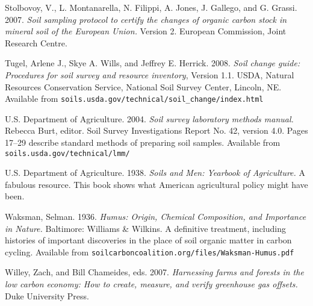 \documentclass[11pt,letterpaper,oneside,onecolumn]{memoir}
\begin{document}
\begin{flushleft}
Stolbovoy, V., L. Montanarella, N. Filippi, A. Jones, J. Gallego, and G. Grassi. 2007. \textit{Soil sampling protocol to certify the changes of organic carbon stock in mineral soil of the European Union.} Version 2. European Commission, Joint Research Centre.

Tugel, Arlene J., Skye A. Wills, and Jeffrey E. Herrick. 2008. \textit{Soil change guide: Procedures for soil survey and resource inventory}, Version 1.1. USDA, Natural Resources Conservation Service, National Soil Survey Center, Lincoln, NE. Available from \texttt{soils.usda.gov/technical/soil\_change/index.html}

U.S. Department of Agriculture. 2004. \textit{Soil survey laboratory methods manual.} Rebecca Burt, editor. Soil Survey Investigations Report No. 42, version 4.0. Pages 17--29 describe standard methods of preparing soil samples. Available from \texttt{soils.usda.gov/technical/lmm/}

U.S. Department of Agriculture. 1938. \textit{Soils and Men: Yearbook of Agriculture.} A fabulous resource. This book shows what American agricultural policy might have been.

Waksman, Selman. 1936. \textit{Humus: Origin, Chemical Composition, and Importance in Nature.} Baltimore: Williams \& Wilkins. A definitive treatment, including histories of important discoveries in the place of soil organic matter in carbon cycling. Available from \texttt{soilcarboncoalition.org/files/Waksman-Humus.pdf}

Willey, Zach, and Bill Chameides, eds. 2007. \textit{Harnessing farms and forests in the low carbon economy: How to create, measure, and verify greenhouse gas offsets.} Duke University Press.

\end{flushleft}

\theendnotes
{}
\clearpage
{}

\printindex
\end{document}
